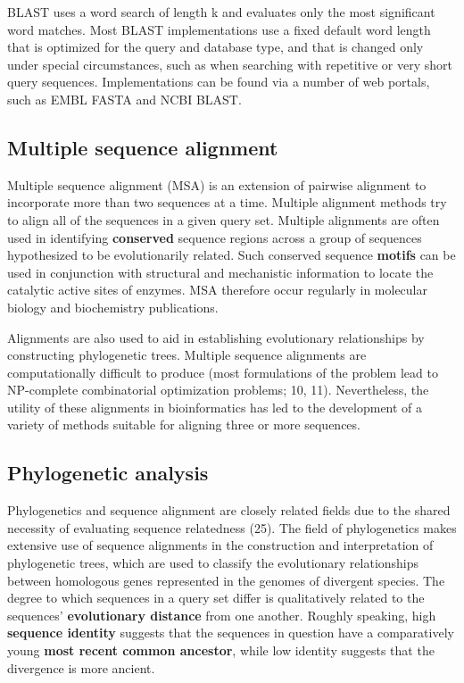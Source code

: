 \documentclass[
]{book}
\begin{document}
BLAST uses a word search of length k and evaluates only the most significant word matches. Most BLAST implementations use a fixed default word length that is optimized for the query and database type, and that is changed only under special circumstances, such as when searching with repetitive or very short query sequences. Implementations can be found via a number of web portals, such as EMBL FASTA and NCBI BLAST.

\hypertarget{multiple-sequence-alignment}{%
\subsection{Multiple sequence alignment}\label{multiple-sequence-alignment}}

Multiple sequence alignment (MSA) is an extension of pairwise alignment to incorporate more than two sequences at a time. Multiple alignment methods try to align all of the sequences in a given query set. Multiple alignments are often used in identifying \textbf{conserved} sequence regions across a group of sequences hypothesized to be evolutionarily related. Such conserved sequence \textbf{motifs} can be used in conjunction with structural and mechanistic information to locate the catalytic active sites of enzymes. MSA therefore occur regularly in molecular biology and biochemistry publications.

Alignments are also used to aid in establishing evolutionary relationships by constructing phylogenetic trees. Multiple sequence alignments are computationally difficult to produce (most formulations of the problem lead to NP-complete combinatorial optimization problems; 10, 11). Nevertheless, the utility of these alignments in bioinformatics has led to the development of a variety of methods suitable for aligning three or more sequences.

\hypertarget{phylogenetic-analysis}{%
\subsection{Phylogenetic analysis}\label{phylogenetic-analysis}}

Phylogenetics and sequence alignment are closely related fields due to the shared necessity of evaluating sequence relatedness (25). The field of phylogenetics makes extensive use of sequence alignments in the construction and interpretation of phylogenetic trees, which are used to classify the evolutionary relationships between homologous genes represented in the genomes of divergent species. The degree to which sequences in a query set differ is qualitatively related to the sequences' \textbf{evolutionary distance} from one another. Roughly speaking, high \textbf{sequence identity} suggests that the sequences in question have a comparatively young \textbf{most recent common ancestor}, while low identity suggests that the divergence is more ancient.
\end{document}

